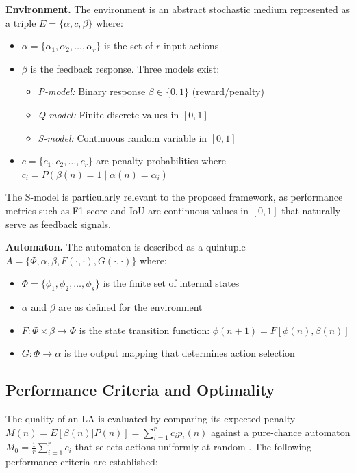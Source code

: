 \documentclass[12pt,oneside]{book}
\begin{document}
\textbf{Environment.} The environment is an abstract stochastic medium represented as a triple $E = \{\alpha, c, \beta\}$ where:
\begin{itemize}
    \item $\alpha = \{\alpha_1, \alpha_2, \ldots, \alpha_r\}$ is the set of $r$ input actions
    \item $\beta$ is the feedback response. Three models exist:
    \begin{itemize}
        \item \textit{P-model:} Binary response $\beta \in \{0, 1\}$ (reward/penalty)
        \item \textit{Q-model:} Finite discrete values in $[0,1]$
        \item \textit{S-model:} Continuous random variable in $[0,1]$
    \end{itemize}
    \item $c = \{c_1, c_2, \ldots, c_r\}$ are penalty probabilities where $c_i = P(\beta(n) = 1 \mid \alpha(n) = \alpha_i)$
\end{itemize}
The S-model is particularly relevant to the proposed framework, as performance metrics such as F1-score and IoU are continuous values in $[0,1]$ that naturally serve as feedback signals.

\textbf{Automaton.} The automaton is described as a quintuple $A = \{\Phi, \alpha, \beta, F(\cdot,\cdot), G(\cdot,\cdot)\}$ where:
\begin{itemize}
    \item $\Phi = \{\phi_1, \phi_2, \ldots, \phi_s\}$ is the finite set of internal states
    \item $\alpha$ and $\beta$ are as defined for the environment
    \item $F: \Phi \times \beta \rightarrow \Phi$ is the state transition function: $\phi(n+1) = F[\phi(n), \beta(n)]$
    \item $G: \Phi \rightarrow \alpha$ is the output mapping that determines action selection
\end{itemize}

\subsection{Performance Criteria and Optimality}
\label{subsec:la-performance}

The quality of an LA is evaluated by comparing its expected penalty $M(n) = E[\beta(n)|P(n)] = \sum_{i=1}^{r} c_i p_i(n)$ against a pure-chance automaton $M_0 = \frac{1}{r}\sum_{i=1}^{r} c_i$ that selects actions uniformly at random \citep{Narendra1989}. The following performance criteria are established:
\end{document}
